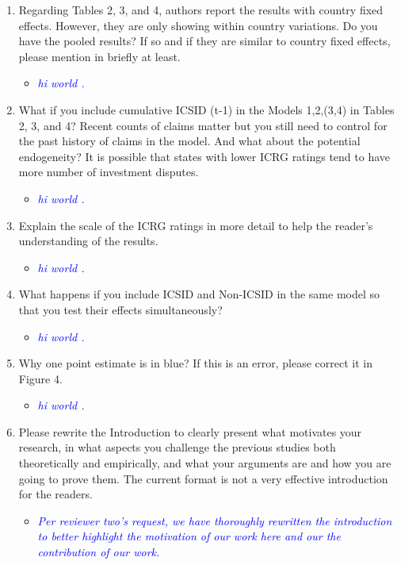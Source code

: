 \begin{enumerate}
\begin{itemize}
	\end{itemize}
	\item Regarding Tables 2, 3, and 4, authors report the results with country fixed effects. However, they are only showing within country variations. Do you have the pooled results? If so and if they are similar to country fixed effects, please mention in briefly at least.
	\begin{itemize}
		\item \textcolor{blue}{ \emph{ hi world . }}
	\end{itemize}
	\item What if you include cumulative ICSID (t-1) in the Models 1,2,(3,4) in Tables 2, 3, and 4? Recent counts of claims matter but you still need to control for the past history of claims in the model. And what about the potential endogeneity? It is possible that states with lower ICRG ratings tend to have more number of investment disputes.		
	\begin{itemize}
		\item \textcolor{blue}{ \emph{ hi world . }}
	\end{itemize}
	\item Explain the scale of the ICRG ratings in more detail to help the reader’s understanding of the results.	
	\begin{itemize}
		\item \textcolor{blue}{ \emph{ hi world . }}
	\end{itemize}
	\item What happens if you include ICSID and Non-ICSID in the same model so that you test their effects simultaneously?		
	\begin{itemize}
		\item \textcolor{blue}{ \emph{ hi world . }}
	\end{itemize}
	\item Why one point estimate is in blue? If this is an error, please correct it in Figure 4.	
	\begin{itemize}
		\item \textcolor{blue}{ \emph{ hi world . }}
	\end{itemize}
	\item Please rewrite the Introduction to clearly present what motivates your research, in what aspects you challenge the previous studies both theoretically and empirically, and what your arguments are and how you are going to prove them. The current format is not a very effective introduction for the readers.
	\begin{itemize}
		\item \textcolor{blue}{ \emph{ Per reviewer two's request, we have thoroughly rewritten the introduction to better highlight the motivation of our work here and our the contribution of our work. }}
	\end{itemize}	
\end{enumerate}